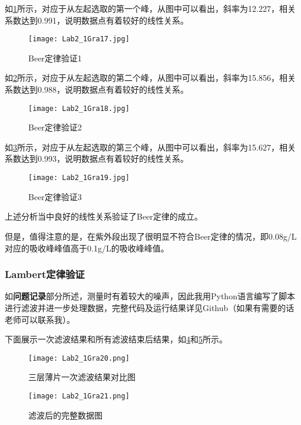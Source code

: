 \documentclass[dvipsnames, svgnames,a4paper,11pt]{article}
\begin{document}
	如\cref{fig:fig17}所示，对应于从左起选取的第一个峰，从图中可以看出，斜率为12.227，相关系数达到0.991，说明数据点有着较好的线性关系。
	
	\begin{figure}[htbp]
		\centering
		\texttt{[image: Lab2\_1Gra17.jpg]}
		\caption{Beer定律验证1}
		\label{fig:fig17}
	\end{figure}
	
	\clearpage
	如\cref{fig:fig18}所示，对应于从左起选取的第二个峰，从图中可以看出，斜率为15.856，相关系数达到0.988，说明数据点有着较好的线性关系。
	
	\begin{figure}[htbp]
		\centering
		\texttt{[image: Lab2\_1Gra18.jpg]}
		\caption{Beer定律验证2}
		\label{fig:fig18}
	\end{figure}
	
	如\cref{fig:fig19}所示，对应于从左起选取的第三个峰，从图中可以看出，斜率为15.627，相关系数达到0.993，说明数据点有着较好的线性关系。
	
	\begin{figure}[htbp]
		\centering
		\texttt{[image: Lab2\_1Gra19.jpg]}
		\caption{Beer定律验证3}
		\label{fig:fig19}
	\end{figure}
	
	上述分析当中良好的线性关系验证了Beer定律的成立。
	
	但是，值得注意的是，在紫外段出现了很明显不符合Beer定律的情况，即0.08g/L对应的吸收峰峰值高于0.1g/L的吸收峰峰值。
	
	\subsubsection{Lambert定律验证}
	如\textbf{问题记录}部分所述，测量时有着较大的噪声，因此我用Python语言编写了脚本进行滤波并进一步处理数据，完整代码及运行结果详见Github（如果有需要的话老师可以联系我）。
	
	下面展示一次滤波结果和所有滤波结束后结果，如\cref{fig:fig20}和\cref{fig:fig21}所示。
	
	\begin{figure}[htbp]
		\centering
		\texttt{[image: Lab2\_1Gra20.png]}
		\caption{三层薄片一次滤波结果对比图}
		\label{fig:fig20}
	\end{figure}
	
	\begin{figure}[htbp]
		\centering
		\texttt{[image: Lab2\_1Gra21.png]}
		\caption{滤波后的完整数据图}
		\label{fig:fig21}
	\end{figure}
	
\end{document}
